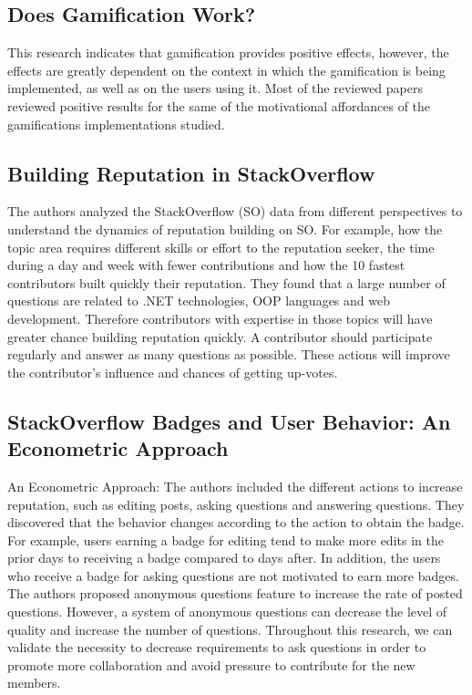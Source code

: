 \documentclass{sigchi}
\begin{document}
\subsection{Does Gamification Work?}

This research indicates that gamification provides positive effects, however,
the effects are greatly dependent on the context in which the gamification is
being implemented, as well as on the users using it. Most of the reviewed
papers reviewed positive results for the same of the motivational affordances
of the gamifications implementations studied.

\subsection{Building Reputation in StackOverflow}

 The authors analyzed the StackOverflow (SO) data from different perspectives to understand the dynamics of reputation building on SO. For example, how the topic area requires different skills or effort to the reputation seeker, the time during a day and week with fewer contributions and how the 10 fastest contributors built quickly their reputation. They found that a large number of questions are related to .NET technologies, OOP languages and web development. Therefore contributors with expertise in those topics will have greater chance building reputation quickly. A contributor should participate regularly and answer as many questions as possible. These actions will improve the contributor’s influence and chances of getting up-votes.


\subsection{StackOverflow Badges and User Behavior: An Econometric Approach}

An Econometric Approach: The authors included the different actions to increase reputation, such as editing posts, asking questions and answering questions. They discovered that the behavior changes according to the action to obtain the badge. For example, users earning a badge for editing tend to make more edits in the prior days to receiving a badge compared to days after. In addition, the users who receive a badge for asking questions are not motivated to earn more badges. The authors proposed anonymous questions feature to increase the rate of posted questions. However, a system of anonymous questions can decrease the level of quality and increase the number of questions. Throughout this research, we can validate the necessity to decrease requirements to ask questions in order to promote more collaboration and avoid pressure to contribute for the new members.
\end{document}
